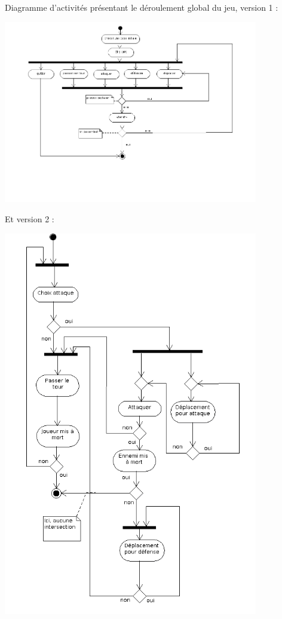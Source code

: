 \documentclass[a4paper,10pt]{report}
\begin{document}
    Diagramme d'activités présentant le déroulement global du jeu, version 1 : 
    
    \includegraphics[width=420px]{diagrammes/Dofus_ActivityDiagram.png}

    Et version 2 : 

    \includegraphics[width=420px]{diagrammes/Dofus_diag_activite.png}
    
\end{document}
